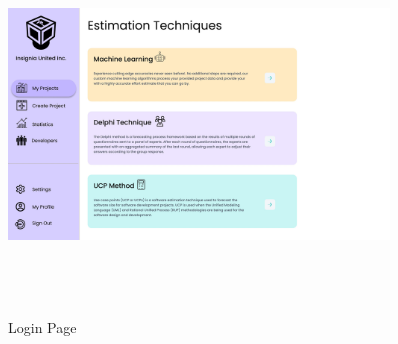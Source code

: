 \begin{figure}[H]
\includegraphics[height=10cm, width=0.9\textwidth]{./images/prototype/0011}
\centering 
\caption{Login Page}
\label{fig:prototype1}
\end{figure}

